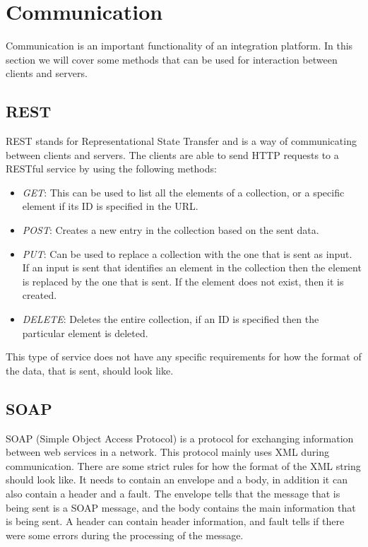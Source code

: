 \section{Communication}

Communication is an important functionality of an integration platform.
In this section we will cover some methods that can be used for interaction between clients and servers. 

\subsection{REST}
REST stands for Representational State Transfer and is a way of communicating between clients and servers.
The clients are able to send HTTP requests to a RESTful service by using the following methods:

\begin{itemize}
\item \textit{GET}: This can be used to list all the elements of a collection, or a specific element if its ID is specified in the URL.
\item \textit{POST}: Creates a new entry in the collection based on the sent data.
\item \textit{PUT}: Can be used to replace a collection with the one that is sent as input. If an input is sent that identifies an element in the collection then the element is replaced by the one that is sent. If the element does not exist, then it is created.
\item \textit{DELETE}: Deletes the entire collection, if an ID is specified then the particular element is deleted.
\end{itemize}

This type of service does not have any specific requirements for how the format of the data, that is sent, should look like. \cite{REST}

\subsection{SOAP}
SOAP (Simple Object Access Protocol) is a protocol for exchanging information between web services in a network.
This protocol mainly uses XML during communication.
There are some strict rules for how the format of the XML string should look like.
It needs to contain an envelope and a body, in addition it can also contain a header and a fault.
The envelope tells that the message that is being sent is a SOAP message, and the body contains the main information that is being sent.
A header can contain header information, and fault tells if there were some errors during the processing of the message. \cite{SOAP}

